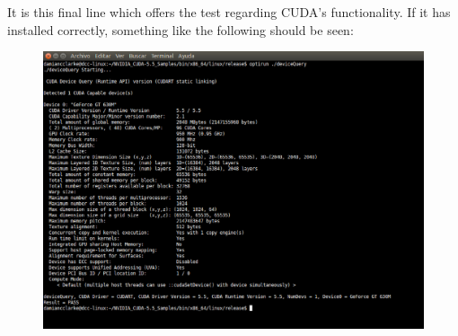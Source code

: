 \documentclass[a4paper,10pt]{article}
\begin{document}
It is this final line which offers the test regarding CUDA's functionality.  If
it has installed correctly, something like the following should be seen:
\begin{figure}[htpb!]
\begin{center}
\includegraphics[scale=0.4]{devicequery.eps} 
\end{center}
\end{figure}
\end{document}
